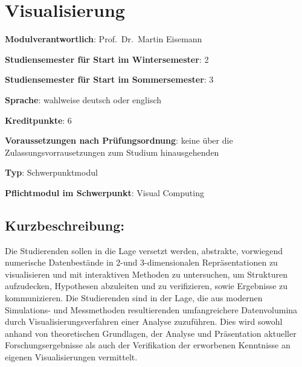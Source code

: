 \chapter{Visualisierung\label{/mi-2017/modulbeschreibungen-master/MA_VC_Modul_Visualisierung}}\label{visualisierungpathlabelmi-2017modulbeschreibungen-mastermaux5fvcux5fmodulux5fvisualisierung}

\begin{modulHead}
\textbf{Modulverantwortlich}: Prof.~Dr.~Martin
Eisemann
\end{modulHead}
\begin{modulHead}
\textbf{Studiensemester für
Start im Wintersemester}:
2
\end{modulHead}
\begin{modulHead}
\textbf{Studiensemester für Start
im Sommersemester}:
3
\end{modulHead}
\begin{modulHead}
\textbf{Sprache}: wahlweise deutsch
oder englisch
\end{modulHead}
\begin{modulHead}
\textbf{Kreditpunkte}:
6
\end{modulHead}
\begin{modulHead}
\textbf{Voraussetzungen nach
Prüfungsordnung}: keine über die Zulassungsvorrausetzungen zum Studium
hinausgehenden
\end{modulHead}
\begin{modulHead}
\textbf{Typ}:
Schwerpunktmodul
\end{modulHead}
\begin{modulHead}
\textbf{Pflichtmodul
im Schwerpunkt}: Visual Computing
\end{modulHead}


\section*{Kurzbeschreibung:\label{/mi-2017/modulbeschreibungen-master/MA_VC_Modul_Visualisierung}}\label{kurzbeschreibungpathlabelmi-2017modulbeschreibungen-mastermaux5fvcux5fmodulux5fvisualisierung}

Die Studierenden sollen in die Lage versetzt werden, abstrakte,
vorwiegend numerische Datenbestände in 2-und 3-dimensionalen
Repräsentationen zu visualisieren und mit interaktiven Methoden zu
untersuchen, um Strukturen aufzudecken, Hypothesen abzuleiten und zu
verifizieren, sowie Ergebnisse zu kommunizieren. Die Studierenden sind
in der Lage, die aus modernen Simulations- und Messmethoden
resultierenden umfangreichere Datenvolumina durch
Visualisierungsverfahren einer Analyse zuzuführen. Dies wird sowohl
anhand von theoretischen Grundlagen, der Analyse und Präsentation
aktueller Forschungsergebnisse als auch der Verifikation der erworbenen
Kenntnisse an eigenen Visualisierungen vermittelt.


